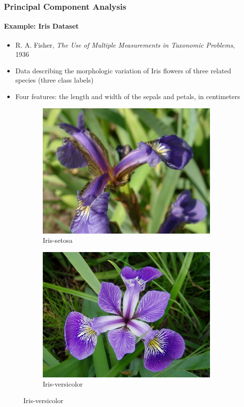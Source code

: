 \documentclass[12pt,a4paper,xcolor=dvipsnames,xcolor=table]{beamer}
\begin{document}
\begin{frame}
\frametitle{Principal Component Analysis}
\framesubtitle{Example: Iris Dataset}
    \begin{itemize}
        \item R. A. Fisher, \textit{The Use of Multiple Measurements in Taxonomic Problems}, 1936
        \item Data describing the morphologic variation of Iris flowers of three related species (three class labels) 
        \item Four features: the length and width of the sepals and petals, in centimeters
    \end{itemize}
    \begin{figure}
        \centering
        \begin{subfigure}{0.3\textwidth}
            \includegraphics[width=\textwidth]{fig/iris_setosa.jpg}\caption{Iris-setosa}
        \end{subfigure}
        \begin{subfigure}{0.3\textwidth}
            \includegraphics[width=\textwidth]{fig/iris_versicolor.jpg}\caption{Iris-versicolor}

\end{subfigure}
\end{figure}
\end{frame}
\end{document}
